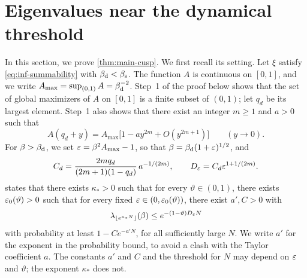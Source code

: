 \section{Eigenvalues near the dynamical threshold}\label{sec:inf-cusp}

In this section, we prove \cref{thm:main-cusp}. We first recall its setting. Let $\xi$ satisfy \eqref{eq:inf-summability} with $\beta_{\mathrm d}<\beta_{\mathrm s}$. The function $A$ is continuous on $[0,1]$, and we write $A_{\max}=\sup_{(0,1)}A=\beta_{\mathrm d}^{-2}$. Step~1 of the proof below shows that the set of global maximizers of $A$ on $[0,1]$ is a finite subset of $(0,1)$; let $q_d$ be its largest element. Step~1 also shows that there exist an integer $m\ge1$ and $a>0$ such that
\begin{equation}\label{eq:inf-taylor}
A(q_d+y)=A_{\max}\bigl[1-ay^{2m}+O(y^{2m+1})\bigr]\qquad(y\to0).
\end{equation}
For $\beta>\beta_{\mathrm d}$, we set $\varepsilon=\beta^2A_{\max}-1$, so that $\beta=\beta_{\mathrm d}(1+\varepsilon)^{1/2}$, and
\begin{equation*}
C_d=\frac{2mq_d}{(2m+1)(1-q_d)}\,a^{-1/(2m)},\qquad D_\varepsilon=C_d\varepsilon^{1+1/(2m)}.
\end{equation*}
 states that there exists $\kappa_*>0$ such that for every $\vartheta\in(0,1)$, there exists $\varepsilon_0(\vartheta)>0$ such that for every fixed $\varepsilon\in(0,\varepsilon_0(\vartheta))$, there exist $a',C>0$ with
\begin{equation*}
\lambda_{\lfloor e^{\kappa_*N}\rfloor}(\beta)\le e^{-(1-\vartheta)D_\varepsilon N}
\end{equation*}
with probability at least $1-Ce^{-a'N}$, for all sufficiently large $N$. We write $a'$ for the exponent in the probability bound, to avoid a clash with the Taylor coefficient $a$. The constants $a'$ and $C$ and the threshold for $N$ may depend on $\varepsilon$ and $\vartheta$; the exponent $\kappa_*$ does not.

